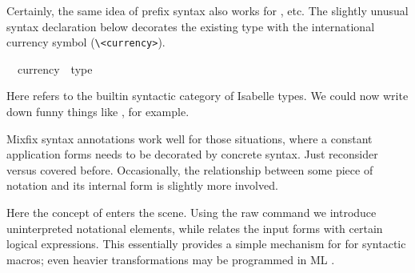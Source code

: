 \begin{isabellebody}
\begin{isamarkuptext}
  \medskip Certainly, the same idea of prefix syntax also works for
  ,  etc.  The slightly
  unusual syntax declaration below decorates the existing  type with the international currency symbol \isa{{\isasymcurrency}}
  (\verb,\,\verb,<currency>,).%
\end{isamarkuptext}%
\isamarkuptrue%
\isanewline
\ \ currency\ {\isacharcolon}{\isacharcolon}\ type\ \ \ \ {\isacharparenleft}{\isachardoublequote}{\isasymcurrency}{\isachardoublequote}{\isacharparenright}\isamarkupfalse%
%
\begin{isamarkuptext}%
\noindent Here  refers to the builtin syntactic category
  of Isabelle types.  We could now write down funny things like , for example.%
\end{isamarkuptext}%
\isamarkuptrue%
%
\isamarkuptrue%
%
\begin{isamarkuptext}%
Mixfix syntax annotations work well for those situations, where a
  constant application forms needs to be decorated by concrete syntax.
  Just reconsider  versus  covered
  before.  Occasionally, the relationship between some piece of
  notation and its internal form is slightly more involved.

  Here the concept of  enters the scene.
  Using the raw  command we
  introduce uninterpreted notational elements, while
   relates the input forms with certain logical
  expressions.  This essentially provides a simple mechanism for for
  syntactic macros; even heavier transformations may be programmed in
  ML \cite{isabelle-ref}.


\end{isamarkuptext}
\end{isabellebody}
